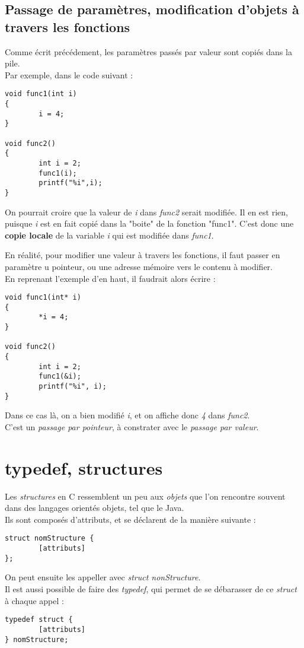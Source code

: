 \documentclass{report}
\begin{document}
\subsection{Passage de paramètres, modification d'objets à travers les fonctions}
Comme écrit précédement, les paramètres passés par valeur sont copiés dans la pile.\\
Par exemple, dans le code suivant :
\begin{lstlisting}
void func1(int i)
{
        i = 4;
}

void func2()
{
        int i = 2;
        func1(i);
        printf("%i",i);
}
\end{lstlisting}
On pourrait croire que la valeur de \emph{i} dans \emph{func2} serait modifiée.
Il en est rien, puisque \emph{i} est en fait copié dans la "boite" de la fonction "func1".
C'est donc une \textbf{copie locale} de la variable \emph{i} qui est modifiée dans \emph{func1}.\\
\par
En réalité, pour modifier une valeur à travers les fonctions, il faut passer en paramètre u pointeur, ou une adresse mémoire vers le contenu à modifier.\\
En reprenant l'exemple d'en haut, il faudrait alors écrire :
\begin{lstlisting}
void func1(int* i)
{
        *i = 4;
}

void func2()
{
        int i = 2;
        func1(&i);
        printf("%i", i);
}
\end{lstlisting}
Dans ce cas là, on a bien modifié \emph{i}, et on affiche donc \emph{4} dans \emph{func2}.\\
C'est un \emph{passage par pointeur}, à constrater avec le \emph{passage par valeur}.
\section{typedef, structures}
Les \emph{structures} en C ressemblent un peu aux \emph{objets} que l'on rencontre souvent dans des langages orientés objets, tel que le Java.\\
Ils sont composés d'attributs, et se déclarent de la manière suivante :
\begin{lstlisting}
struct nomStructure {
        [attributs]
};
\end{lstlisting}
On peut ensuite les appeller avec \emph{struct nonStructure}.\\
Il est aussi possible de faire des \emph{typedef}, qui permet de se débarasser de ce \emph{struct} à chaque appel :
\begin{lstlisting}
typedef struct {
        [attributs]
} nomStructure;
\end{lstlisting}
\end{document}
